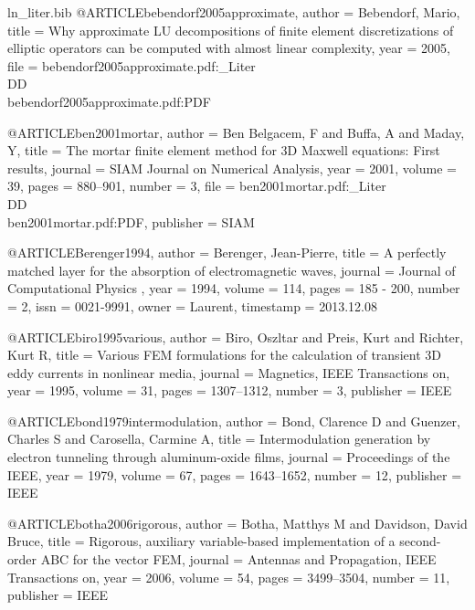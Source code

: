 \begin{filecontents*}{ln_liter.bib}
@ARTICLE{bebendorf2005approximate,
  author = {Bebendorf, Mario},
  title = {Why approximate LU decompositions of finite element discretizations
	of elliptic operators can be computed with almost linear complexity},
  year = {2005},
  file = {bebendorf2005approximate.pdf:_Liter\\DD\\bebendorf2005approximate.pdf:PDF}
}

@ARTICLE{ben2001mortar,
  author = {Ben Belgacem, F and Buffa, A and Maday, Y},
  title = {The mortar finite element method for {3D} {M}axwell equations: First
	results},
  journal = {SIAM Journal on Numerical Analysis},
  year = {2001},
  volume = {39},
  pages = {880--901},
  number = {3},
  file = {ben2001mortar.pdf:_Liter\\DD\\ben2001mortar.pdf:PDF},
  publisher = {SIAM}
}

@ARTICLE{Berenger1994,
  author = {Berenger, Jean-Pierre},
  title = {A perfectly matched layer for the absorption of electromagnetic waves},
  journal = {Journal of Computational Physics },
  year = {1994},
  volume = {114},
  pages = {185 - 200},
  number = {2},
  issn = {0021-9991},
  owner = {Laurent},
  timestamp = {2013.12.08}
}

@ARTICLE{biro1995various,
  author = {Biro, Oszltar and Preis, Kurt and Richter, Kurt R},
  title = {Various {FEM} formulations for the calculation of transient {3D}
	eddy currents in nonlinear media},
  journal = {Magnetics, IEEE Transactions on},
  year = {1995},
  volume = {31},
  pages = {1307--1312},
  number = {3},
  publisher = {IEEE}
}

@ARTICLE{bond1979intermodulation,
  author = {Bond, Clarence D and Guenzer, Charles S and Carosella, Carmine A},
  title = {Intermodulation generation by electron tunneling through aluminum-oxide
	films},
  journal = {Proceedings of the IEEE},
  year = {1979},
  volume = {67},
  pages = {1643--1652},
  number = {12},
  publisher = {IEEE}
}

@ARTICLE{botha2006rigorous,
  author = {Botha, Matthys M and Davidson, David Bruce},
  title = {Rigorous, auxiliary variable-based implementation of a second-order
	{ABC} for the vector {FEM}},
  journal = {Antennas and Propagation, IEEE Transactions on},
  year = {2006},
  volume = {54},
  pages = {3499--3504},
  number = {11},
  publisher = {IEEE}
}


\end{filecontents*}

